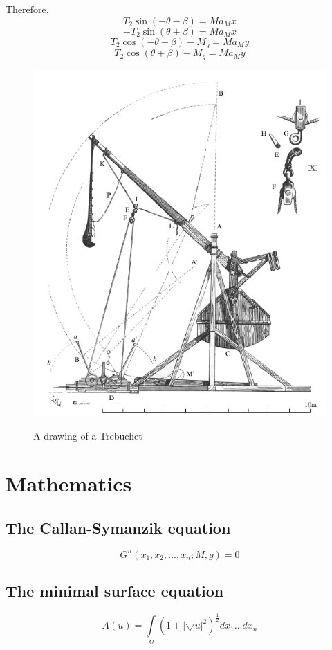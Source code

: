 \documentclass[11pt]{book}
\begin{document}
Therefore,
$$ T_2 \sin(-\theta - \beta) =Ma_Mx $$ 
$$ - T_2 \sin(\theta + \beta) =Ma_Mx $$ 
$$ T_2 \cos(-\theta - \beta) - M_g =Ma_My $$ 
$$ T_2 \cos( \theta + \beta) - M_g =Ma_My $$ 
\cite{online1}
\newpage
\begin{figure}
\begin{center}
\caption{A drawing of a Trebuchet}
\centering
\label{fig:pictureoftrebuchet}
\includegraphics[scale=0.5, angle=45]{four}
\end{center}
\end{figure}
\section{Mathematics}
\subsection{The Callan-Symanzik equation}
\begin{equation}
[M \frac{\partial}{\partial M}+ \beta(g)\frac{\partial}{\partial g}+n\gamma]G^n(x_1,x_2, ... ,x_n;M,g)=0
\end{equation}
\subsection{The minimal surface equation}
\begin{equation}
A(u) = \int\limits_\Omega (1+ |\bigtriangledown u|^2)^\frac{1}{2} dx_1 ... dx_n
\end{equation}
\end{document}
